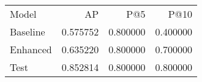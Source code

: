 \begin{tabular}{lrrr}
Model & AP & P@5 & P@10 \\
Baseline & 0.575752 & 0.800000 & 0.400000 \\
Enhanced & 0.635220 & 0.800000 & 0.700000 \\
Test & 0.852814 & 0.800000 & 0.800000 \\
\end{tabular}
